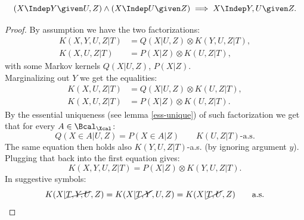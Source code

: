 \begin{Lem}
    \[ (X \Indep  Y \given U , Z) \land (X \Indep  U \given Z)  \implies X \Indep  Y , U \given Z.\]
\begin{proof}
 By assumption we have the two factorizations:
    \begin{align*}
        K(X,Y,U,Z|T) & = Q(X|U,Z) \otimes K(Y,U,Z|T),\\
        K(X,U,Z|T) & = P(X|Z) \otimes K(U,Z|T),
    \end{align*}
    with some Markov kernels $Q(X|U,Z)$, $P(X|Z)$.\\
    Marginalizing out $Y$ we get the equalities:
    \begin{align*}
        K(X,U,Z|T) & = Q(X|U,Z) \otimes K(U,Z|T),\\
        K(X,U,Z|T) & = P(X|Z) \otimes K(U,Z|T).
    \end{align*}
    By the essential uniqueness (see lemma \ref{ess-unique}) of such factorization we get that for every $A \in \Bcal_\Xcal$:
\[ Q(X \in A|U,Z) = P(X \in A|Z) \qquad K(U,Z|T)\text{-a.s.}\]
The same equation then holds also $K(Y,U,Z|T)$-a.s. (by ignoring argument $y$).
Plugging that back into the first equation gives:
\[ K(X,Y,U,Z|T) = P(X|Z) \otimes K(Y,U,Z|T).\]
In suggestive symbols:
\[ K(X|\cancel{T,Y,U},Z) = K(X|\cancel{T,Y},U,Z) =  K(X|\cancel{T,U},Z) \qquad \text{a.s.}\]
\end{proof}
\end{Lem}


